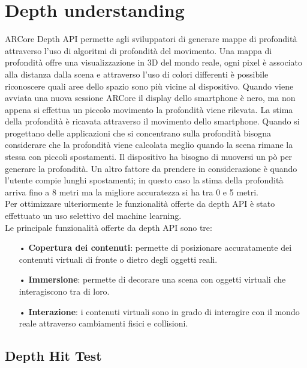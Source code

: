 \documentclass[crop=false, class=book]{standalone}
\begin{document}
		
	\chapter{Depth understanding}
	
		ARCore Depth API  permette agli sviluppatori di generare mappe di profondità attraverso l'uso di algoritmi di 					profondità del movimento. Una mappa di profondità offre una visualizzazione in 3D del mondo reale, ogni pixel è 				associato alla distanza dalla scena e attraverso l'uso di colori differenti è possibile riconoscere quali aree dello 			spazio sono più vicine al dispositivo. Quando viene avviata una nuova sessione ARCore il display dello smartphone è 			nero, ma non appena si effettua un piccolo movimento la profondità viene rilevata. La stima della profondità è ricavata 		attraverso il movimento dello smartphone. Quando si progettano delle applicazioni che si concentrano sulla profondità 			bisogna considerare che la profondità viene calcolata meglio quando la scena rimane la stessa con piccoli spostamenti. 			Il dispositivo ha bisogno di muoversi un pò per generare la profondità. Un altro fattore da prendere in considerazione 			è quando l'utente compie lunghi spostamenti; in questo caso la stima della profondità arriva fino a 8 metri ma la 				migliore accuratezza si ha tra 0 e 5 metri.\\
		Per ottimizzare ulteriormente le funzionalità offerte da depth API è stato effettuato un uso selettivo del machine 				learning.\\
		 Le principale funzionalità offerte da depth API sono tre:
		\begin{itemize}
			\item[•] \textbf{Copertura dei contenuti}: permette di posizionare accuratamente dei contenuti virtuali di fronte o dietro degli oggetti reali.
			\item[•] \textbf{Immersione}: permette di decorare una scena con oggetti virtuali che interagiscono tra di loro.
			\item[•] \textbf{Interazione}: i contenuti virtuali sono in grado di interagire con il mondo reale attraverso cambiamenti fisici e collisioni.
		\end{itemize}
		
		\clearpage
		
		\section{Depth Hit Test}
		
\end{document}
